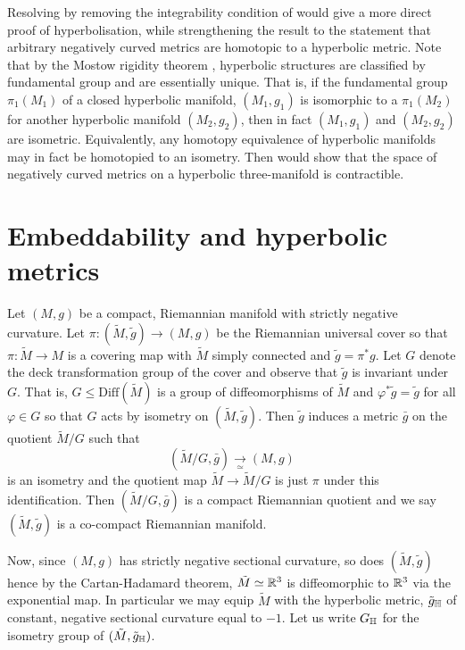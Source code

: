 \documentclass[a4paper,12pt]{amsart}
\begin{document}
Resolving  by removing the integrability condition of  would give a more direct proof of hyperbolisation, while strengthening the result to the statement that arbitrary negatively curved metrics are homotopic to a hyperbolic metric. Note that by the Mostow rigidity theorem \cite{MR0236383}, hyperbolic structures are classified by fundamental group and are essentially unique. That is, if the fundamental group \(\pi_1(M_1)\) of a closed hyperbolic manifold, \((M_1, g_1)\) is isomorphic to a \(\pi_1(M_2)\) for another hyperbolic manifold \((M_2, g_2)\), then in fact \((M_1, g_1)\) and \((M_2, g_2)\) are isometric. Equivalently, any homotopy equivalence of hyperbolic manifolds may in fact be homotopied to an isometry. Then  would show that the space of negatively curved metrics on a hyperbolic three-manifold is contractible.

\section{Embeddability and hyperbolic metrics}
\label{sec:embed_intg}

Let \((M, g)\) be a compact, Riemannian manifold with strictly negative curvature. Let \(\pi\colon (\tilde{M}, \tilde{g}) \to (M, g)\) be the Riemannian universal cover so that \(\pi : \tilde{M} \to M\) is a covering map with \(\tilde{M}\) simply connected and \(\tilde{g} = \pi^{\ast} g\). Let \(G\) denote the deck transformation group of the cover and observe that \(\tilde{g}\) is invariant under \(G\). That is, \(G \leq \text{Diff}(\tilde{M})\) is a group of diffeomorphisms of \(\tilde{M}\) and \(\varphi^{\ast} \tilde{g} = \tilde{g}\) for all \(\varphi \in G\) so that \(G\) acts by isometry on \((\tilde{M}, \tilde{g})\). Then \(\tilde{g}\) induces a metric \(\bar{g}\) on the quotient \(\tilde{M}/G\) such that
\[
(\tilde{M}/G, \bar{g}) \underset{\simeq}{\to} (M, g)
\]
is an isometry and the quotient map \(\tilde{M} \to \tilde{M}/G\) is just \(\pi\) under this identification. Then \((\tilde{M}/G, \bar{g})\) is a compact Riemannian quotient and we say \((\tilde{M}, \tilde{g})\) is a co-compact Riemannian manifold.

Now, since \((M, g)\) has strictly negative sectional curvature, so does \((\tilde{M}, \tilde{g})\) hence by the Cartan-Hadamard theorem, \(\tilde{M} \simeq \mathbb{R}^3\) is diffeomorphic to \(\mathbb{R}^3\) via the exponential map. In particular we may equip \(\tilde{M}\) with the hyperbolic metric, \(\tilde{g}_{\mathbb{H}}\) of constant, negative sectional curvature equal to \(-1\). Let us write \(G_{\mathbb{H}}\) for the isometry group of \((\tilde{M}, \tilde{g}_{\mathbb{H}})\).
\end{document}

